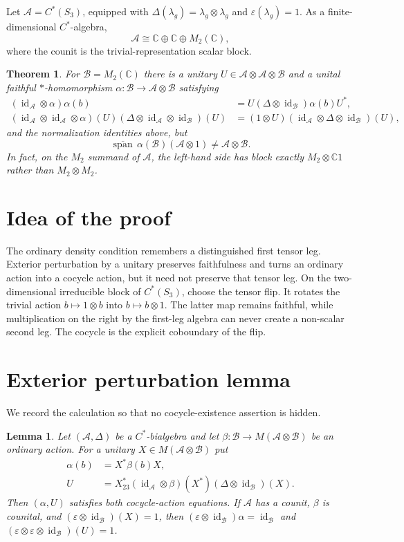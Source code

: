 \documentclass[11pt]{article}
\newtheorem{theorem}{Theorem}
\newtheorem{lemma}{Lemma}
\newcommand{\A}{\mathcal A}
\newcommand{\B}{\mathcal B}
\newcommand{\id}{\operatorname{id}}
\newcommand{\spn}{\operatorname{span}}
\begin{document}
Let $\A=C^*(S_3)$, equipped with
$\Delta(\lambda_g)=\lambda_g\otimes\lambda_g$ and
$\varepsilon(\lambda_g)=1$.  As a finite-dimensional $C^*$-algebra,
\[
 \A\cong\mathbb C\oplus\mathbb C\oplus M_2(\mathbb C),
\]
where the counit is the trivial-representation scalar block.

\begin{theorem}\label{thm:counterexample}
For $\B=M_2(\mathbb C)$ there is a unitary
$U\in\A\otimes\A\otimes\B$ and a unital faithful $*$-homomorphism
$\alpha:\B\to\A\otimes\B$ satisfying
\begin{align*}
 (\id_{\A}\otimes\alpha)\alpha(b)
   &=U(\Delta\otimes\id_{\B})\alpha(b)U^*,\\
 (\id_{\A}\otimes\id_{\A}\otimes\alpha)(U)
   (\Delta\otimes\id_{\A}\otimes\id_{\B})(U)
   &=(1\otimes U)(\id_{\A}\otimes\Delta\otimes\id_{\B})(U),
\end{align*}
and the normalization identities above, but
\[
 \overline{\spn}\,\alpha(\B)(\A\otimes1)
 \ne \A\otimes\B.
\]
In fact, on the $M_2$ summand of $\A$, the left-hand side has block exactly
$M_2\otimes\mathbb C1$ rather than $M_2\otimes M_2$.
\end{theorem}

\section{Idea of the proof}

The ordinary density condition remembers a distinguished first tensor leg.
Exterior perturbation by a unitary preserves faithfulness and turns an
ordinary action into a cocycle action, but it need not preserve that tensor
leg.  On the two-dimensional irreducible block of $C^*(S_3)$, choose the
tensor flip.  It rotates the trivial action $b\mapsto1\otimes b$ into
$b\mapsto b\otimes1$.  The latter map remains faithful, while multiplication
on the right by the first-leg algebra can never create a non-scalar second
leg.  The cocycle is the explicit coboundary of the flip.

\section{Exterior perturbation lemma}

We record the calculation so that no cocycle-existence assertion is hidden.

\begin{lemma}\label{lem:gauge}
Let $(\A,\Delta)$ be a $C^*$-bialgebra and let
$\beta:\B\to M(\A\otimes\B)$ be an ordinary action.  For a unitary
$X\in M(\A\otimes\B)$ put
\begin{align}
 \alpha(b)&=X^*\beta(b)X,\label{eq:alpha}\\
 U&=X_{23}^*(\id_{\A}\otimes\beta)(X^*)
        (\Delta\otimes\id_{\B})(X).
 \label{eq:U}
\end{align}
Then $(\alpha,U)$ satisfies both cocycle-action equations.  If $\A$ has a
counit, $\beta$ is counital, and
$(\varepsilon\otimes\id_{\B})(X)=1$, then
$(\varepsilon\otimes\id_{\B})\alpha=\id_{\B}$ and
$(\varepsilon\otimes\varepsilon\otimes\id_{\B})(U)=1$.
\end{lemma}
\end{document}
